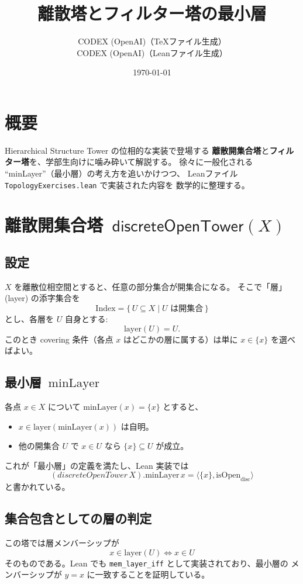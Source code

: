 \documentclass[a4paper]{ltjsarticle}
\title{離散塔とフィルター塔の最小層}
\author{CODEX (OpenAI)（TeXファイル生成）\\CODEX (OpenAI)（Leanファイル生成）}
\date{\today}
\newcommand{\minLayer}{\mathrm{minLayer}} %
\begin{document}
\maketitle

\section{概要}
Hierarchical Structure Tower の位相的な実装で登場する
\textbf{離散開集合塔}と\textbf{フィルター塔}を、学部生向けに噛み砕いて解説する。
徐々に一般化される ``minLayer''（最小層）の考え方を追いかけつつ、
Leanファイル \texttt{TopologyExercises.lean} で実装された内容を
数学的に整理する。

\section{離散開集合塔 $\,\mathsf{discreteOpenTower}(X)$}
\subsection{設定}
$X$ を離散位相空間とすると、任意の部分集合が開集合になる。
そこで「層」(layer) の添字集合を
\[
  \mathrm{Index} = \{\, U \subseteq X \mid U \text{ は開集合} \,\}
\]
とし、各層を $U$ 自身とする:
\[
  \mathrm{layer}(U) = U.
\]
このとき covering 条件（各点 $x$ はどこかの層に属する）は単に
$x \in \{x\}$ を選べばよい。

\subsection{最小層 $\,\minLayer$}
各点 $x\in X$ について $\minLayer(x) = \{x\}$ とすると、
\begin{itemize}
  \item $x \in \mathrm{layer}(\minLayer(x))$ は自明。
  \item 他の開集合 $U$ で $x \in U$ なら $\{x\} \subseteq U$ が成立。
\end{itemize}
これが「最小層」の定義を満たし、Lean 実装では
\[
  (discreteOpenTower\,X).\minLayer\, x
  = \langle \{x\}, \text{isOpen}_\mathrm{disc} \rangle
\]
と書かれている。

\subsection{集合包含としての層の判定}
この塔では層メンバーシップが
\[
  x \in \mathrm{layer}(U) \iff x \in U
\]
そのものである。Lean でも
\texttt{mem\_layer\_iff} として実装されており、最小層の
メンバーシップが $y=x$ に一致することを証明している。
\end{document}
